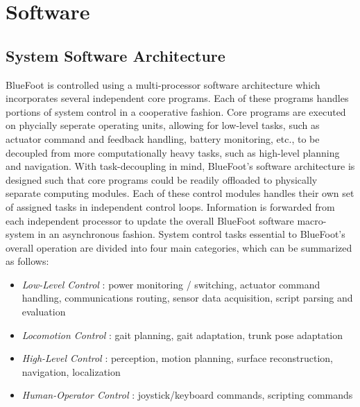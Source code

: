 \label{ch::software}
\chapter{Software}
	
	\section{System Software Architecture}
	
	BlueFoot is controlled using a multi-processor software architecture which incorporates several independent core programs. Each of these programs handles portions of system control in a cooperative fashion. Core programs are executed on phycially seperate operating units, allowing for low-level tasks, such as actuator command and feedback handling, battery monitoring, etc., to be decoupled from more computationally heavy tasks, such as high-level planning and navigation. With task-decoupling in mind, BlueFoot's software architecture is designed such that core programs could be readily offloaded to physically separate computing modules. Each of these control modules handles their own set of assigned tasks in independent control loops. Information is forwarded from each independent processor to update the overall BlueFoot software macro-system in an asynchronous fashion. System control tasks essential to BlueFoot's overall operation are divided into four main categories, which can be summarized as follows:
		\begin{itemize}
			\item{
			\emph{Low-Level Control} : 
				power monitoring / switching, 
				actuator command handling, 
				communications routing,
				sensor data acquisition,
				script parsing and evaluation
			}
			\item{
			\emph{Locomotion Control} : 
				gait planning, 
				gait adaptation, 
				trunk pose adaptation
			}
			\item{
			\emph{High-Level Control} : 
				perception, 
				motion planning, 
				surface reconstruction, 
				navigation, 
				localization
			}
			\item{
			\emph{Human-Operator Control} : 
				joystick/keyboard commands,
				scripting commands
			}
		\end{itemize}
